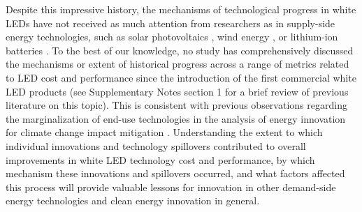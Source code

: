 \documentclass[parskip=full]{article}
\begin{document}
Despite this impressive history, the mechanisms of technological progress in white LEDs have not received as much attention from researchers as in supply-side energy technologies, such as solar photovoltaics \cite{kavlak2018evaluating, nemet2019solar}, wind energy \cite{qiu2012price, jennings2020policy}, or lithium-ion batteries \cite{Ziegler2021, Stephan2021}. To the best of our knowledge, no study has comprehensively discussed the mechanisms or extent of historical progress across a range of metrics related to LED cost and performance since the introduction of the first commercial white LED products (see Supplementary Notes section 1 for a brief review of previous literature on this topic). This is consistent with previous observations regarding the marginalization of end-use technologies in the analysis of energy innovation for climate change impact mitigation \cite{Wilson2012, Creutzig2018}. Understanding the extent to which individual innovations and technology spillovers contributed to overall improvements in white LED technology cost and performance, by which mechanism these innovations and spillovers occurred, and what factors affected this process will provide valuable lessons for innovation in other demand-side energy technologies and clean energy innovation in general.
\end{document}
